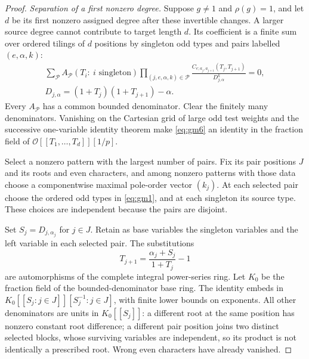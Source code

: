 \documentclass[11pt]{article}
\theoremstyle{definition}
\numberwithin{equation}{section}
\begin{document}
\begin{proof}
\emph{Separation of a first nonzero degree.}
Suppose $g\ne1$ and $\rho(g)=1$, and let $d$ be its first nonzero
assigned degree after these invertible changes. A larger source
degree cannot contribute to target length $d$. Its coefficient is
a finite sum over ordered tilings of $d$ positions by singleton
odd types and pairs labelled $(e,\alpha,k)$:
\begin{equation}
 \begin{gathered}
 \sum_{\mathcal P}A_{\mathcal P}(T_i:\ i\text{ singleton})
       \prod_{(j,e,\alpha,k)\in\mathcal P}
       \frac{C_{e;a_j,a_{j+1}}(T_j,T_{j+1})}
            {D_{j,\alpha}^{k}}=0,\\
 D_{j,\alpha}=(1+T_j)(1+T_{j+1})-\alpha.
 \end{gathered}                                            \label{eq:gm6}
\end{equation}
Every $A_{\mathcal P}$ has a common bounded denominator. Clear
the finitely many denominators. Vanishing on the Cartesian grid
of large odd test weights and the successive one-variable identity
theorem make \eqref{eq:gm6} an identity in the fraction field of
$\mathcal O[[T_1,\ldots,T_d]][1/p]$.

Select a nonzero pattern with the largest number of pairs. Fix its
pair positions $J$ and its roots and even characters, and among
nonzero patterns with those data choose a componentwise maximal
pole-order vector $(k_j)$. At each selected pair choose the ordered
odd types in \eqref{eq:gm1}, and at each singleton its source type. These
choices are independent because the pairs are disjoint.

Set $S_j=D_{j,\alpha_j}$ for $j\in J$. Retain as base variables
the singleton variables and the left variable in each selected pair.
The substitutions
\begin{equation}
 T_{j+1}=\frac{\alpha_j+S_j}{1+T_j}-1
\end{equation}
are automorphisms of the complete integral power-series ring.
Let $K_0$ be the fraction field of the bounded-denominator base
ring. The identity embeds in $K_0[[S_j:j\in J]][S_j^{-1}:j\in J]$,
with finite lower bounds on exponents. All other denominators are
units in $K_0[[S_j]]$: a different root at the same position has
nonzero constant root difference; a different pair position joins
two distinct selected blocks, whose surviving variables are
independent, so its product is not identically a prescribed root.
Wrong even characters have already vanished.


\end{proof}
\end{document}
